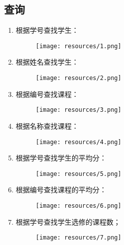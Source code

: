 \documentclass[UTF8]{ctexart}
\begin{document}
    \subsection{查询}
    \begin{enumerate}
        \item 根据学号查找学生：
        \begin{figure}[H]
            \centering
            \texttt{[image: resources/1.png]}
        \end{figure}
        \item 根据姓名查找学生：
        \begin{figure}[H]
            \centering
            \texttt{[image: resources/2.png]}
        \end{figure}
        \item 根据编号查找课程：
        \begin{figure}[H]
            \centering
            \texttt{[image: resources/3.png]}
        \end{figure}
        \item 根据名称查找课程：
        \begin{figure}[H]
            \centering
            \texttt{[image: resources/4.png]}
        \end{figure}
        \item 根据学号查找学生的平均分：
        \begin{figure}[H]
            \centering
            \texttt{[image: resources/5.png]}
        \end{figure}
        \item 根据编号查找课程的平均分：
        \begin{figure}[H]
            \centering
            \texttt{[image: resources/6.png]}
        \end{figure}
        \item 根据学号查找学生选修的课程数；
        \begin{figure}[H]
            \centering
            \texttt{[image: resources/7.png]}
        \end{figure}
    \end{enumerate}
\end{document}
